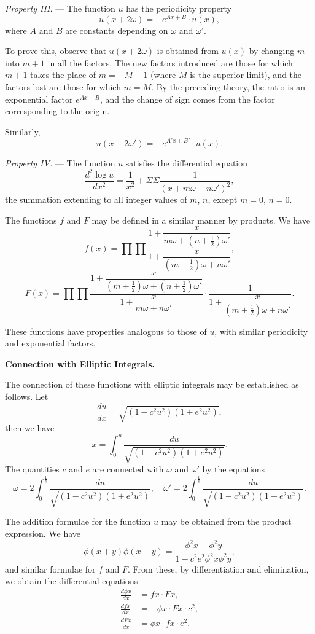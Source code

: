\documentclass[11pt,a4paper]{book}
\begin{document}
\newpage
\setcounter{page}{142}

\textit{Property III.} --- The function $u$ has the periodicity property
\[
u(x + 2\omega) = -e^{Ax + B} \cdot u(x),\]
where $A$ and $B$ are constants depending on $\omega$ and $\omega'$.

To prove this, observe that $u(x + 2\omega)$ is obtained from $u(x)$ by changing $m$ into
$m + 1$ in all the factors. The new factors introduced are those for which $m + 1$ takes
the place of $m = -M - 1$ (where $M$ is the superior limit), and the factors lost are
those for which $m = M$. By the preceding theory, the ratio is an exponential factor
$e^{Ax + B}$, and the change of sign comes from the factor corresponding to the origin.

Similarly,
\[
u(x + 2\omega') = -e^{A'x + B'} \cdot u(x).\]

\textit{Property IV.} --- The function $u$ satisfies the differential equation
\[
\frac{d^2 \log u}{dx^2} = \frac{1}{x^2} + \Sigma \Sigma \frac{1}{(x + m\omega + n\omega')^2},
\]
the summation extending to all integer values of $m$, $n$, except $m = 0$, $n = 0$.

\newpage
\setcounter{page}{143}

The functions $f$ and $F$ may be defined in a similar manner by products. We have
\[
f(x) = \prod \prod \frac{1 + \dfrac{x}{m\omega + (n + \frac{1}{2})\omega'}}{1 + \dfrac{x}{(m + \frac{1}{2})\omega + n\omega'}},
\]
\[
F(x) = \prod \prod \frac{1 + \dfrac{x}{(m + \frac{1}{2})\omega + (n + \frac{1}{2})\omega'}}{1 + \dfrac{x}{m\omega + n\omega'}} \cdot \frac{1}{1 + \dfrac{x}{(m + \frac{1}{2})\omega + n\omega'}}.
\]

These functions have properties analogous to those of $u$, with similar periodicity
and exponential factors.

\medskip

\textbf{Connection with Elliptic Integrals.}

The connection of these functions with elliptic integrals may be established as
follows. Let
\[
\frac{du}{dx} = \sqrt{(1 - c^2 u^2)(1 + e^2 u^2)},
\]
then we have
\[
x = \int_0^u \frac{du}{\sqrt{(1 - c^2 u^2)(1 + e^2 u^2)}}.
\]
The quantities $c$ and $e$ are connected with $\omega$ and $\omega'$ by the equations
\[
\omega = 2\int_0^{\frac{1}{c}} \frac{du}{\sqrt{(1 - c^2 u^2)(1 + e^2 u^2)}},\quad
\omega' = 2\int_0^{\frac{1}{e}} \frac{du}{\sqrt{(1 - c^2 u^2)(1 + e^2 u^2)}}.
\]

\newpage
\setcounter{page}{144}

The addition formulae for the function $u$ may be obtained from the product
expression. We have
\[
\phi(x + y)\phi(x - y) = \frac{\phi^2 x - \phi^2 y}{1 - c^2 e^2 \phi^2 x \phi^2 y},
\]
and similar formulae for $f$ and $F$. From these, by differentiation and elimination,
we obtain the differential equations
\begin{align*}
\frac{d\phi x}{dx} &= f x \cdot F x,\\
\frac{d f x}{dx} &= -\phi x \cdot F x \cdot c^2,\\
\frac{d F x}{dx} &= \phi x \cdot f x \cdot e^2.
\end{align*}
\end{document}
